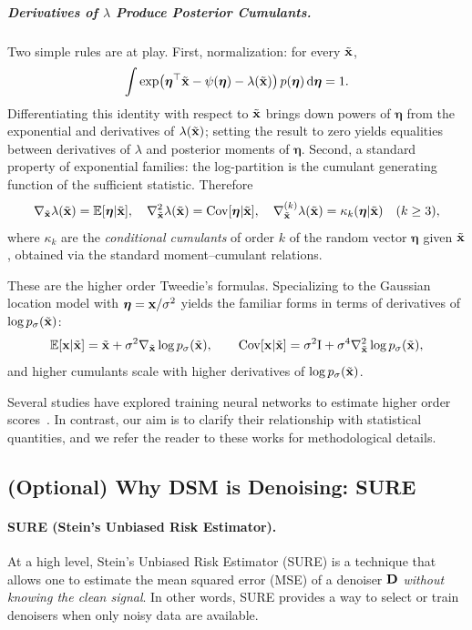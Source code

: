 \subparagraph{Derivatives of $\lambda$ Produce Posterior Cumulants.}
Two simple rules are at play.
First, normalization: for every $\tilde{{\mathbf{x}}}$,
\[
\int \exp\!\big(\boldsymbol\eta^\top \tilde{{\mathbf{x}}}-\psi(\boldsymbol\eta)-\lambda(\tilde{{\mathbf{x}}})\big)\,p(\boldsymbol\eta)\mathop{}\!\mathrm{d}\boldsymbol\eta
=1.
\]
Differentiating this identity with respect to $\tilde{{\mathbf{x}}}$ brings down powers of $\boldsymbol\eta$ from the exponential and derivatives of $\lambda(\tilde{{\mathbf{x}}})$; setting the result to zero yields equalities between derivatives of $\lambda$ and posterior moments of $\boldsymbol\eta$.
Second, a standard property of exponential families: the log-partition is the cumulant generating function of the sufficient statistic.
Therefore
\[
\nabla_{\tilde{{\mathbf{x}}}}\lambda(\tilde{{\mathbf{x}}})=\mathbb{E}[\boldsymbol\eta|\tilde{{\mathbf{x}}}],\quad
\nabla_{\tilde{{\mathbf{x}}}}^{2}\lambda(\tilde{{\mathbf{x}}})=\mathrm{Cov}[\boldsymbol\eta|\tilde{{\mathbf{x}}}],\quad
\nabla_{\tilde{{\mathbf{x}}}}^{(k)}\lambda(\tilde{{\mathbf{x}}})=\kappa_k(\boldsymbol\eta|\tilde{{\mathbf{x}}})\quad(k\ge 3),
\]
where $\kappa_k$ are the \emph{conditional cumulants} of order $k$ of the random vector $\boldsymbol\eta$ given $\tilde{{\mathbf{x}}}$, obtained via the standard moment–cumulant relations.


These are the higher order Tweedie's formulas.
Specializing to the Gaussian location model with $\boldsymbol\eta={\mathbf{x}}/\sigma^2$ yields the familiar forms in terms of derivatives of $\log p_\sigma(\tilde{{\mathbf{x}}})$:
\[
\mathbb{E}[{\mathbf{x}}|\tilde{{\mathbf{x}}}]
=\tilde{{\mathbf{x}}}+\sigma^2\nabla_{\tilde{{\mathbf{x}}}}\log p_\sigma(\tilde{{\mathbf{x}}}),
\qquad
\mathrm{Cov}[{\mathbf{x}}|\tilde{{\mathbf{x}}}]
=\sigma^2\mathrm I+\sigma^4\nabla_{\tilde{{\mathbf{x}}}}^{2}\log p_\sigma(\tilde{{\mathbf{x}}}),
\]
and higher cumulants scale with higher derivatives of $\log p_\sigma(\tilde{{\mathbf{x}}})$.


Several studies have explored training neural networks to estimate higher order scores~\citep{meng2021estimating,lu2022maximum,lai2023fp}. In contrast, our aim is to clarify their relationship with statistical quantities, and we refer the reader to these works for methodological details.

\subsection{(Optional) Why DSM is Denoising: SURE}\label{subsec:why-dsm-denoising-sure}


\paragraph{SURE (Stein’s Unbiased Risk Estimator).}
At a high level, Stein’s Unbiased Risk Estimator (SURE) is a technique that allows one to 
estimate the mean squared error (MSE) of a denoiser ${\mathbf{D}}$ \emph{without knowing the clean signal}. 
In other words, SURE provides a way to select or train denoisers when only noisy data are available.

